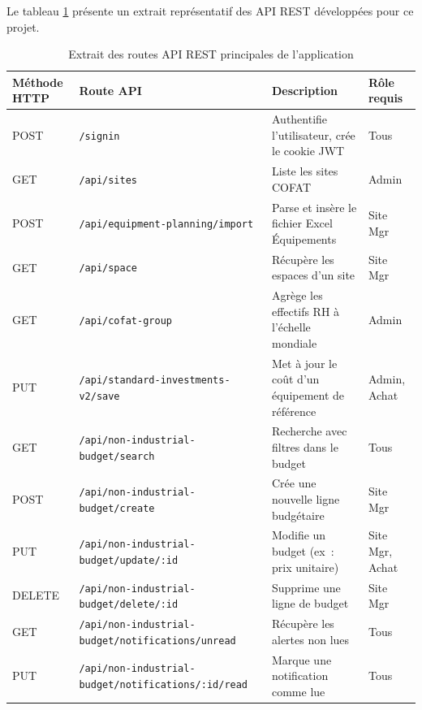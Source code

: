 Le tableau \ref{tab:api_endpoints} présente un extrait représentatif des API REST développées pour ce projet.

\begin{table}[h]
\centering
\begin{tabular}{|p{2.5cm}|p{6cm}|p{4.5cm}|p{2cm}|}
\hline
\textbf{Méthode HTTP} & \textbf{Route API} & \textbf{Description} & \textbf{Rôle requis} \\ \hline
POST & \texttt{/signin} & Authentifie l'utilisateur, crée le cookie JWT & Tous \\ \hline
GET & \texttt{/api/sites} & Liste les sites COFAT & Admin \\ \hline
POST & \texttt{/api/equipment-planning/import} & Parse et insère le fichier Excel Équipements & Site Mgr \\ \hline
GET & \texttt{/api/space} & Récupère les espaces d'un site & Site Mgr \\ \hline
GET & \texttt{/api/cofat-group} & Agrège les effectifs RH à l'échelle mondiale & Admin \\ \hline
PUT & \texttt{/api/standard-investments-v2/save} & Met à jour le coût d'un équipement de référence & Admin, Achat \\ \hline
GET & \texttt{/api/non-industrial-budget/search} & Recherche avec filtres dans le budget & Tous \\ \hline
POST & \texttt{/api/non-industrial-budget/create} & Crée une nouvelle ligne budgétaire & Site Mgr \\ \hline
PUT & \texttt{/api/non-industrial-budget/update/:id} & Modifie un budget (ex~: prix unitaire) & Site Mgr, Achat \\ \hline
DELETE & \texttt{/api/non-industrial-budget/delete/:id} & Supprime une ligne de budget & Site Mgr \\ \hline
GET & \texttt{/api/non-industrial-budget/notifications/unread} & Récupère les alertes non lues & Tous \\ \hline
PUT & \texttt{/api/non-industrial-budget/notifications/:id/read} & Marque une notification comme lue & Tous \\ \hline
\end{tabular}
\caption{Extrait des routes API REST principales de l'application}
\label{tab:api_endpoints}
\end{table}

